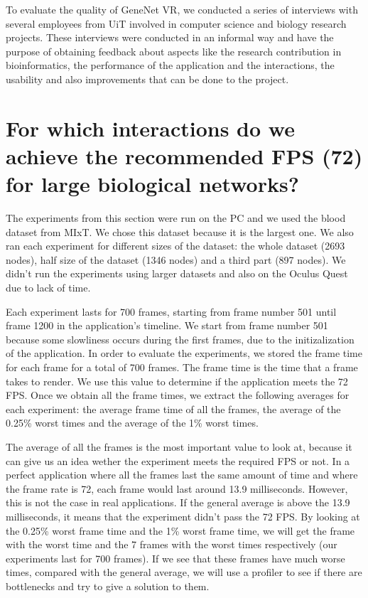
To evaluate the quality of GeneNet VR, we conducted a series of interviews with several employees from UiT involved in computer science and biology research projects. These interviews were conducted in an informal way and have the purpose of obtaining feedback about aspects like the research contribution in bioinformatics, the performance of the application and the interactions, the usability and also improvements that can be done to the project.

\section{For which interactions do we achieve the recommended FPS (72) for large biological networks?}


The experiments from this section were run on the PC and we used the blood dataset from MIxT. We chose this dataset because it is the largest one. We also ran each experiment for different sizes of the dataset: the whole dataset (2693 nodes), half size of the dataset (1346 nodes) and a third part (897 nodes). We didn't run the experiments using larger datasets and also on the Oculus Quest due to lack of time.

Each experiment lasts for 700 frames, starting from frame number 501 until frame 1200 in the application's timeline. We start from frame number 501 because some slowliness occurs during the  first frames, due to the initizalization of the application. In order to evaluate the experiments, we stored the frame time for each frame for a total of 700 frames. The frame time is the time that a frame takes to render. We use this value to determine if the application meets the 72 FPS. Once we obtain all the frame times, we extract the following averages for each experiment: the average frame time of all the frames, the average of the 0.25\% worst times and the average of the 1\% worst times.

The average of all the frames is the most important value to look at, because it can give us an idea wether the experiment meets the required FPS or not. In a perfect application where all the frames last the same amount of time and where the frame rate is 72, each frame would last around 13.9 milliseconds. However, this is not the case in real applications. If the general average is above the 13.9 milliseconds, it means that the experiment didn't pass the 72 FPS. By looking at the 0.25\% worst frame time and the 1\% worst frame time, we will get the frame with the worst time and the 7 frames with the worst times respectively (our experiments last for 700 frames). If we see that these frames have much worse times, compared with the general average, we will use a profiler to see if there are bottlenecks and try to give a solution to them.

